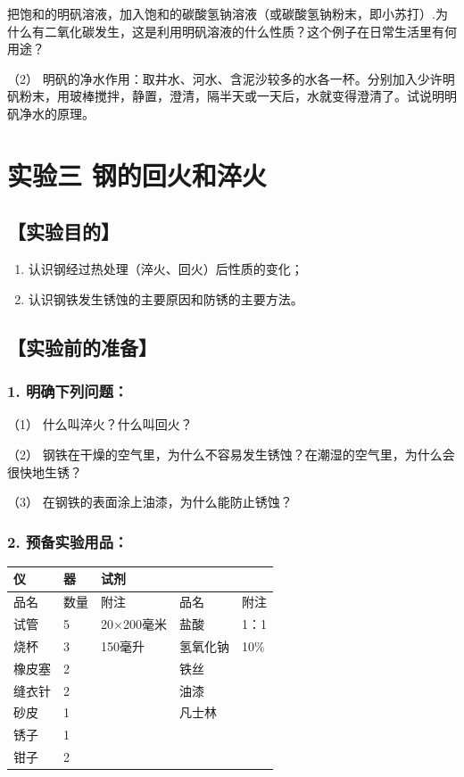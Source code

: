 把饱和的明矾溶液，加入饱和的碳酸氢钠溶液（或碳酸氢钠粉末，即小苏打）.为什么有二氧化碳发生，这是利用明矾溶液的什么性质？这个例子在日常生活里有何用途？

（2）
明矾的净水作用：取井水、河水、含泥沙较多的水各一杯。分别加入少许明矾粉末，用玻棒搅拌，静置，澄清，隔半天或一天后，水就变得澄清了。试说明明矾净水的原理。

\section{实验三 钢的回火和淬火}

\subsection{【实验目的】}

\begin{enumerate}
\item
  认识钢经过热处理（淬火、回火）后性质的变化；
\item
  认识钢铁发生锈蚀的主要原因和防锈的主要方法。
\end{enumerate}

\subsection{【实验前的准备】}

\subsubsection{1. 明确下列问题：}

（1） 什么叫淬火？什么叫回火？

（2）
钢铁在干燥的空气里，为什么不容易发生锈蚀？在潮湿的空气里，为什么会很快地生锈？

（3） 在钢铁的表面涂上油漆，为什么能防止锈蚀？

\subsubsection{2. 预备实验用品：}

{\def\LTcaptype{none} %
\begin{longtable}[]{@{}lllll@{}}
\toprule\noalign{}
仪 & 器 & 试剂 & & \\
\midrule\noalign{}
\endhead
\bottomrule\noalign{}
\endlastfoot
品名 & 数量 & 附注 & 品名 & 附注 \\
试管 & 5 & 20×200毫米 & 盐酸 & 1：1 \\
烧杯 & 3 & 150毫升 & 氢氧化钠 & 10\% \\
橡皮塞 & 2 & & 铁丝 & \\
缝衣针 & 2 & & 油漆 & \\
砂皮 & 1 & & 凡士林 & \\
锈子 & 1 & & & \\
钳子 & 2 & & & \\
\end{longtable}
}

